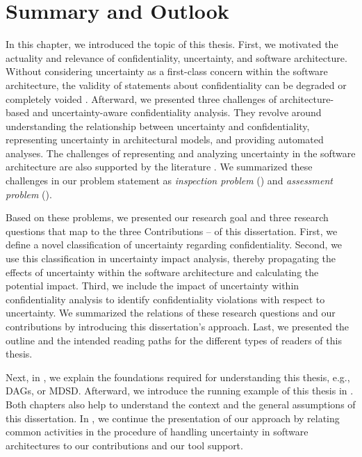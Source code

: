 \section{Summary and Outlook}%
\label{sec:introduction:summary}

In this chapter, we introduced the topic of this thesis.
First, we motivated the actuality and relevance of confidentiality, uncertainty, and software architecture.
Without considering uncertainty as a first-class concern within the software architecture, the validity of statements about confidentiality can be degraded or completely voided \cite{hahner_dealing_2021}.
Afterward, we presented three challenges of architecture-based and uncertainty-aware confidentiality analysis.
They revolve around understanding the relationship between uncertainty and confidentiality, representing uncertainty in architectural models, and providing automated analyses. 
The challenges of representing and analyzing uncertainty in the software architecture are also supported by the literature \cite{troya_uncertainty_2021,hezavehi_uncertainty_2021}.
We summarized these challenges in our problem statement as \emph{inspection problem} () and \emph{assessment problem} ().

Based on these problems, we presented our research goal and three research questions that map to the three Contributions  --  of this dissertation.
First, we define a novel classification of uncertainty regarding confidentiality.
Second, we use this classification in uncertainty impact analysis, thereby propagating the effects of uncertainty within the software architecture and calculating the potential impact.
Third, we include the impact of uncertainty within confidentiality analysis to identify confidentiality violations with respect to uncertainty.
We summarized the relations of these research questions and our contributions by introducing this dissertation's approach.
Last, we presented the outline and the intended reading paths for the different types of readers of this thesis.

Next, in , we explain the foundations required for understanding this thesis, e.g., \acp{DAG}, or \ac{MDSD}.
Afterward, we introduce the running example of this thesis in .
Both chapters also help to understand the context and the general assumptions of this dissertation.
In , we continue the presentation of our approach by relating common activities in the procedure of handling uncertainty in software architectures to our contributions and our tool support.





